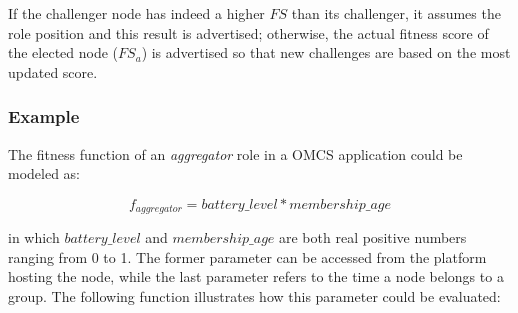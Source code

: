 If the challenger node has indeed a higher $FS$ than its challenger, it assumes the role position and this result is advertised; otherwise, the actual fitness score of the elected node ($FS_a$) is advertised so that new challenges are based on the most updated score.






%


\subsubsection{\textbf{Example}}

The fitness function of an \textit{aggregator} role in a OMCS application could be modeled as: 

$$
f_{aggregator} = battery\_level * membership\_age
$$

\noindent
in which $battery\_level$ and $membership\_age$ are both real positive numbers ranging from 0 to 1. The former parameter can be accessed from the platform hosting the node, while the last parameter refers to the time a node belongs to a group. The following function illustrates how this parameter could be evaluated:

